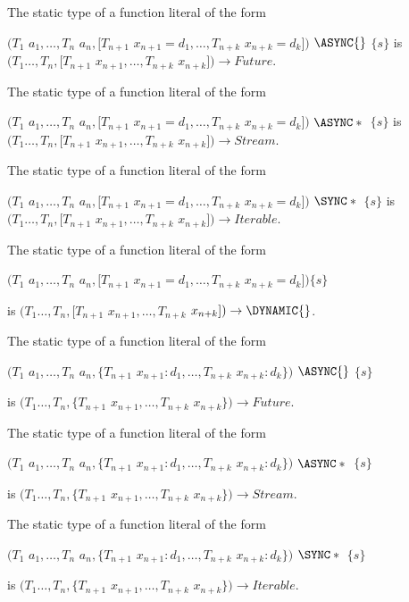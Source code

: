 \documentclass{article}
\begin{document}
\LMHash{}
The static type of a function literal of the form  

$(T_1$ $a_1, \ldots, T_n$ $a_n, [T_{n+1}$ $x_{n+1} = d_1, \ldots,  T_{n+k}$ $x_{n+k}= d_k])$ $ \ASYNC{}$ $\{s\}$ 
is $(T_1 \ldots, T_n, [T_{n+1}$ $x_{n+1}, \ldots, T_{n+k}$ $x_{n+k}]) \rightarrow Future$. 

\LMHash{}
The static type of a function literal of the form  

$(T_1$ $a_1, \ldots, T_n$ $a_n, [T_{n+1}$ $x_{n+1} = d_1, \ldots,  T_{n+k}$ $x_{n+k}= d_k])$ $ \ASYNC*{}$ $\{s\}$ 
is $(T_1 \ldots, T_n, [T_{n+1}$ $x_{n+1}, \ldots, T_{n+k}$ $x_{n+k}]) \rightarrow Stream$. 

\LMHash{}
The static type of a function literal of the form  

$(T_1$ $a_1, \ldots, T_n$ $a_n, [T_{n+1}$ $x_{n+1} = d_1, \ldots,  T_{n+k}$ $x_{n+k}= d_k])$ $ \SYNC*{}$ $\{s\}$ 
is $(T_1 \ldots, T_n, [T_{n+1}$ $x_{n+1}, \ldots, T_{n+k}$ $x_{n+k}]) \rightarrow Iterable$. 


\LMHash{}
The static type of a function literal of the form  

$(T_1$ $a_1, \ldots, T_n$ $a_n, [T_{n+1}$ $x_{n+1} = d_1, \ldots,  T_{n+k}$ $x_{n+k}= d_k])\{s\}$ 

is $(T_1 \ldots, T_n, [T_{n+1}$ $x_{n+1}, \ldots, T_{n+k}$ $x_{n+k}]) \rightarrow  \DYNAMIC{}$. 


\LMHash{}
The static type of a function literal of the form  

$(T_1$ $a_1, \ldots, T_n$ $a_n, \{T_{n+1}$ $x_{n+1} : d_1, \ldots,  T_{n+k}$ $x_{n+k} : d_k\})$ $\ASYNC{}$ $\{s\}$
 
is $(T_1 \ldots, T_n, \{T_{n+1}$ $x_{n+1}, \ldots, T_{n+k}$ $x_{n+k}\}) \rightarrow  Future{}$.

\LMHash{}
The static type of a function literal of the form  

$(T_1$ $a_1, \ldots, T_n$ $a_n, \{T_{n+1}$ $x_{n+1} : d_1, \ldots,  T_{n+k}$ $x_{n+k} : d_k\})$ $\ASYNC*{}$ $\{s\}$
 
is $(T_1 \ldots, T_n, \{T_{n+1}$ $x_{n+1}, \ldots, T_{n+k}$ $x_{n+k}\}) \rightarrow  Stream{}$.

\LMHash{}
The static type of a function literal of the form  

$(T_1$ $a_1, \ldots, T_n$ $a_n, \{T_{n+1}$ $x_{n+1} : d_1, \ldots,  T_{n+k}$ $x_{n+k} : d_k\})$ $\SYNC*{}$ $\{s\}$
 
is $(T_1 \ldots, T_n, \{T_{n+1}$ $x_{n+1}, \ldots, T_{n+k}$ $x_{n+k}\}) \rightarrow  Iterable{}$.
\end{document}
